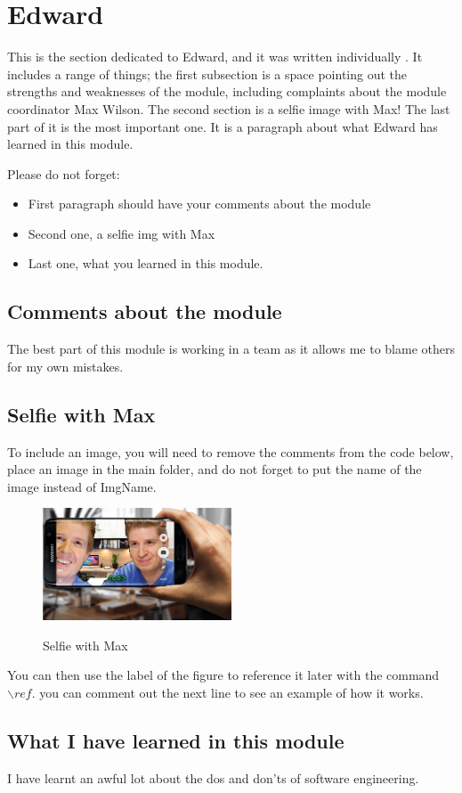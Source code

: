 \section{Edward}
This is the section dedicated to Edward, and it was written individually . It includes a range of things; the first subsection is a space pointing out the strengths and weaknesses of the module, including complaints about the module coordinator Max Wilson. The second section is a selfie image with Max! The last part of it is the most important one. It is a paragraph about what Edward has learned in this module. 

Please do not forget:
\begin{itemize}
	\item First paragraph should have your comments about the module
	\item Second one, a selfie img with Max
	\item Last one, what you learned in this module.
\end{itemize}

\subsection{Comments about the module}
The best part of this module is working in a team as it allows me to blame others for my own mistakes.

\subsection{Selfie with Max}

To include an image, you will need to remove the comments from the code below, place an image in the main folder, and do not forget to put the name of the image instead of ImgName. 

\begin{figure}[h]
\caption{Selfie with Max}
\centering
\includegraphics[width=0.5\textwidth]{images/mastapeece.png}
\label{fig:selfie}
\end{figure}

You can then use the label of the figure to reference it later with the command ${\backslash}ref$. you can comment out the next line to see an example of how it works.


\subsection{What I have learned in this module}
I have learnt an awful lot about the dos and don'ts of software engineering. 

